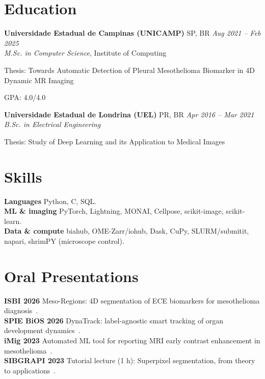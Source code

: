 \documentclass[margin,line]{resume}
\begin{document}
\begin{resume}
       \section{\mysidestyle Education}     
        \textbf{Universidade Estadual de Campinas (UNICAMP)} SP, BR  \hfill \textsl{Aug 2021 -- Feb 2025}\\
           \textit{M.Sc. in Computer Science}, Institute of Computing
           \begin{list2}
            \item Thesis: Towards Automatic Detection of Pleural Mesothelioma Biomarker in 4D Dynamic MR Imaging~\cite{theodoro2025mesothelioma}
            \item GPA: 4.0/4.0
           \end{list2}
        \textbf{Universidade Estadual de Londrina (UEL)} PR, BR  \hfill \textsl{Apr 2016 -- Mar 2021}\\
           \textit{B.Sc. in Electrical Engineering}
           \begin{list2}
            \item Thesis: Study of Deep Learning and its Application to Medical Images
           \end{list2}
        
     \vspace{-0.3cm}
    \section{\mysidestyle Skills}
      \textbf{Languages} Python, C, SQL.\\
      \textbf{ML \& imaging} PyTorch, Lightning, MONAI, Cellpose, scikit-image, scikit-learn.\\
      \textbf{Data \& compute} biahub, OME-Zarr/iohub, Dask, CuPy, SLURM/submitit, napari, shrimPY (microscope control).
     \vspace{-0.3cm}
      \section{\mysidestyle Oral Presentations}
        \textbf{ISBI 2026} Meso-Regions: 4D segmentation of ECE biomarkers for mesothelioma diagnosis~\cite{11515662}.\\
        \textbf{SPIE BiOS 2026} DynaTrack: label-agnostic smart tracking of organ development dynamics~\cite{theodoro2026dynatrack}.\\
        \textbf{iMig 2023} Automated ML tool for reporting MRI early contrast enhancement in mesothelioma~\cite{ARMATO2024107832}.\\
        \textbf{SIBGRAPI 2023} Tutorial lecture (1 h): Superpixel segmentation, from theory to applications~\cite{9643120}.
     \vspace{-0.3cm}

\end{resume}
\end{document}
